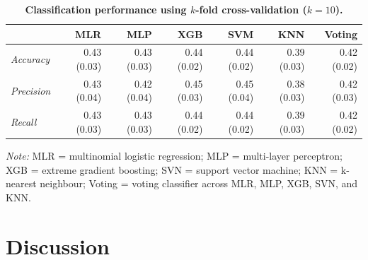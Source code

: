 \documentclass[10pt,letterpaper]{article}
\begin{document}
{{\begin{table}[!ht]
\begin{adjustwidth}{-7mm}{0in} %
\centering
\caption{\bf Classification performance using $k$-fold cross-validation ($k=10$).} 
\vspace{5mm}
\begin{tabular}{|lrrrrrr|}
\hline
 & MLR & MLP & XGB & SVM & KNN & Voting\\\hline
 \emph{Accuracy} &0.43 (0.03) & 0.43 (0.03) &0.44 (0.02) &0.44 (0.02) & 0.39 (0.03) & 0.42 (0.02)\\
 \emph{Precision} & 0.43 (0.04) & 0.42 (0.04) & 0.45 (0.03) & 0.45 (0.04) & 0.38 (0.03) & 0.42 (0.03)\\
 \emph{Recall} & 0.43 (0.03) & 0.43 (0.03) & 0.44 (0.02) & 0.44 (0.02) & 0.39 (0.03) & 0.42 (0.02) \\
 \hline
\end{tabular} 
\label{crossvalidation}
\end{adjustwidth}
\vspace{2mm}

\textit{Note:} MLR = multinomial logistic regression; MLP = multi-layer perceptron; XGB = extreme gradient boosting; SVN = support vector machine; 
KNN = k-nearest neighbour; Voting = voting classifier across MLR, MLP, XGB, SVN, and KNN. \\ 

\end{table}

\section*{Discussion}
}}
\end{document}
